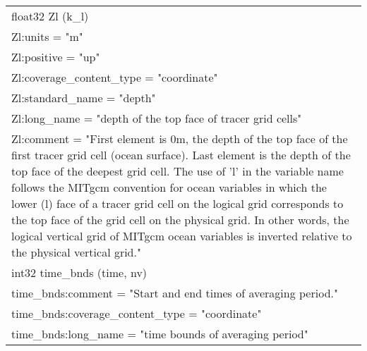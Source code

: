 \begin{longtable}{|p{\textwidth}|}
\rowcolor{Apricot}\hspace{0.5cm}float32 Zl (k\_l)\\
\rowcolor{Apricot}\hspace{0.5cm}\hspace{0.5cm}Zl:units = "m"\\
\rowcolor{Apricot}\hspace{0.5cm}\hspace{0.5cm}Zl:positive = "up"\\
\rowcolor{Apricot}\hspace{0.5cm}\hspace{0.5cm}Zl:coverage\_content\_type = "coordinate"\\
\rowcolor{Apricot}\hspace{0.5cm}\hspace{0.5cm}Zl:standard\_name = "depth"\\
\rowcolor{Apricot}\hspace{0.5cm}\hspace{0.5cm}Zl:long\_name = "depth of the top face of tracer grid cells"\\
\rowcolor{Apricot}\hspace{0.5cm}\hspace{0.5cm}Zl:comment = "First element is 0m, the depth of the top face of the first tracer grid cell (ocean surface). Last element is the depth of the top face of the deepest grid cell. The use of 'l' in the variable name follows the MITgcm convention for ocean variables in which the lower (l) face of a tracer grid cell on the logical grid corresponds to the top face of the grid cell on the physical grid. In other words, the logical vertical grid of MITgcm ocean variables is inverted relative to the physical vertical grid."\\
\rowcolor{Apricot}\hspace{0.5cm}int32 time\_bnds (time, nv)\\
\rowcolor{Apricot}\hspace{0.5cm}\hspace{0.5cm}time\_bnds:comment = "Start and end times of averaging period."\\
\rowcolor{Apricot}\hspace{0.5cm}\hspace{0.5cm}time\_bnds:coverage\_content\_type = "coordinate"\\
\rowcolor{Apricot}\hspace{0.5cm}\hspace{0.5cm}time\_bnds:long\_name = "time bounds of averaging period"\\

\end{longtable}
